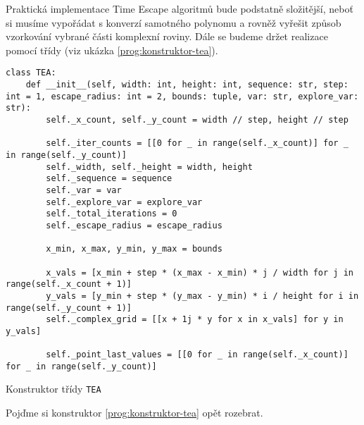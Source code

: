 Praktická implementace Time Escape algoritmů bude podstatně složitější, neboť si musíme vypořádat s konverzí samotného polynomu a rovněž vyřešit způsob vzorkování vybrané části komplexní roviny. Dále se budeme držet realizace pomocí třídy (viz ukázka \ref{prog:konstruktor-tea}).
\begin{program}[h]
\begin{lstlisting}[style=python]
class TEA:
    def __init__(self, width: int, height: int, sequence: str, step: int = 1, escape_radius: int = 2, bounds: tuple, var: str, explore_var: str):
        self._x_count, self._y_count = width // step, height // step
        
        self._iter_counts = [[0 for _ in range(self._x_count)] for _ in range(self._y_count)]
        self._width, self._height = width, height
        self._sequence = sequence
        self._var = var
        self._explore_var = explore_var
        self._total_iterations = 0
        self._escape_radius = escape_radius

        x_min, x_max, y_min, y_max = bounds

        x_vals = [x_min + step * (x_max - x_min) * j / width for j in range(self._x_count + 1)]
        y_vals = [y_min + step * (y_max - y_min) * i / height for i in range(self._y_count + 1)]
        self._complex_grid = [[x + 1j * y for x in x_vals] for y in y_vals]

        self._point_last_values = [[0 for _ in range(self._x_count)] for _ in range(self._y_count)]
\end{lstlisting}
    \caption{Konstruktor třídy \texttt{TEA}}
    \label{prog:konstruktor-tea}
\end{program}
Pojďme si konstruktor \ref{prog:konstruktor-tea} opět rozebrat.
